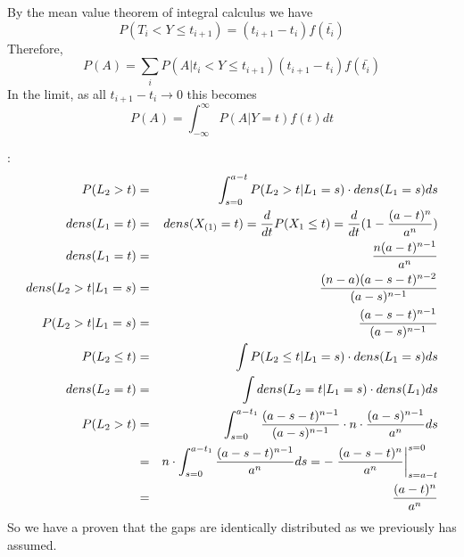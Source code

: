 By the mean value theorem of integral calculus we have
\begin{equation}
P(T_i < Y \leq t_{i+1}) = (t_{i+1}-t_{i})f(\bar{t_i})
\end{equation}
Therefore, 
\begin{equation}
P(A) = \sum_{i} P(A | t_i < Y \leq t_{i+1}) (t_{i+1}-t_i)f(\bar{t_i})
\end{equation}
In the limit, as all $t_{i+1}-t_i \rightarrow 0$ this becomes
\begin{equation}
P(A)= \int_{-\infty}^{\infty} P(A|Y=t)f(t)dt
\end{equation}

:
\begin{eqnarray*}
P(L_2 >t) &=& \int_{s=0}^{a-t} P(L_2>t| L_1 =s) \cdot dens(L_1=s)ds \\
dens(L_1=t) &=& dens(X_{(1)}=t) = \frac{d}{dt} P(X_1 \leq t) = \frac{d}{dt}(1-
\frac{(a-t)^n}{a^n}) \\
dens(L_1 =t) &=& \frac{n (a-t)^{n-1}}{a^n} \\
dens(L_2>t | L_1=s) &=& \frac{(n-a)(a-s-t)^{n-2}}{(a-s)^{n-1}} \\
P(L_2>t | L_1=s) &=& \frac{(a-s-t)^{n-1}}{(a-s)^{n-1}} \\
P(L_2 \leq t) &=& \int P(L_2 \leq t | L_1 =s) \cdot dens(L_1 =s) ds \\
dens(L_2=t) &=& \int dens(L_2=t | L_1=s) \cdot dens(L_1) ds \\
P(L_2>t) &=& \int_{s=0}^{a-t_1} \frac{(a-s-t)^{n-1}}{(a-s)^{n-1}} \cdot
n \cdot \frac{(a-s)^{n-1}}{a^n} ds \\
&=& n \cdot \int_{s=0}^{a-t_1} \frac{(a-s-t)^{n-1}}{a^n} ds =
-\left. \frac{(a-s-t)^n}{a^n}\right|^{s=0}_{s=a-t}\\
&=& \frac{(a-t)^n}{a^n}
\end{eqnarray*}
So we have a proven that the gaps are identically distributed as we
previously has assumed.








